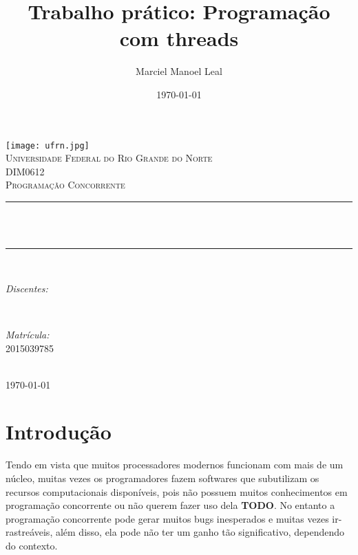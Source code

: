 \documentclass[12pt]{article}
\title{Trabalho prático: Programação com threads}								%
\author{Marciel Manoel Leal}	%
\date{\today}											%
\makeatletter
\let\thetitle\@title
\let\theauthor\@author
\makeatother
\begin{document}

\begin{titlepage}
	\centering
    \vspace*{0.5 cm}
    \texttt{[image: ufrn.jpg]}\\[1.0 cm]	%
    \textsc{\vspace{0.5 cm} \LARGE Universidade Federal do Rio Grande do Norte}\\[2.0 cm]	%
	\textsc{\Large DIM0612}\\[0.5 cm]				%
	\textsc{\large Programação Concorrente}\\[0.5 cm]				%
	\rule{\linewidth}{0.2 mm} \\[0.4 cm]
	{ \huge \bfseries \thetitle}\\
	\rule{\linewidth}{0.2 mm} \\[1.5 cm]
	
	\begin{minipage}{0.4\textwidth}
		\begin{flushleft} \large
			\emph{Discentes:}\\
			\theauthor
			\end{flushleft}
			\end{minipage}~
			\begin{minipage}{0.4\textwidth}
			\begin{flushright} \large
			\emph{Matrícula:} \\
			2015039785								%
		\end{flushright}
	\end{minipage}\\[2 cm]
	
	{\large \today}\\[2 cm]
 
	\vfill
	
\end{titlepage}


\tableofcontents
\pagebreak

\section{Introdução}
Tendo em vista que muitos processadores modernos funcionam com mais de um núcleo, muitas vezes os programadores fazem softwares que subutilizam os recursos computacionais disponíveis, pois não possuem muitos conhecimentos em programação concorrente ou não querem  fazer uso dela \textbf{TODO}. No entanto a programação concorrente pode gerar muitos bugs inesperados e muitas vezes ir-rastreáveis, além disso, ela pode não ter um ganho tão significativo, dependendo do contexto.
\end{document}
